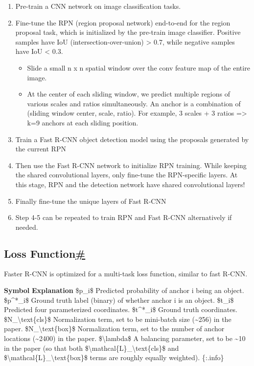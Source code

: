 \begin{enumerate}
\tightlist
\item
  Pre-train a CNN network on image classification tasks.
\item
  Fine-tune the RPN (region proposal network) end-to-end for the region proposal task, which is initialized by the pre-train image classifier. Positive samples have IoU (intersection-over-union) \textgreater{} 0.7, while negative samples have IoU \textless{} 0.3.

  \begin{itemize}
  \tightlist
  \item
    Slide a small n x n spatial window over the conv feature map of the entire image.
  \item
    At the center of each sliding window, we predict multiple regions of various scales and ratios simultaneously. An anchor is a combination of (sliding window center, scale, ratio). For example, 3 scales + 3 ratios =\textgreater{} k=9 anchors at each sliding position.
  \end{itemize}
\item
  Train a Fast R-CNN object detection model using the proposals generated by the current RPN
\item
  Then use the Fast R-CNN network to initialize RPN training. While keeping the shared convolutional layers, only fine-tune the RPN-specific layers. At this stage, RPN and the detection network have shared convolutional layers!
\item
  Finally fine-tune the unique layers of Fast R-CNN
\item
  Step 4-5 can be repeated to train RPN and Fast R-CNN alternatively if needed.
\end{enumerate}

\subsection{\texorpdfstring{Loss Function\hyperref[loss-function-1]{\#}}{Loss Function\#}}\label{loss-function-1}

Faster R-CNN is optimized for a multi-task loss function, similar to fast R-CNN.

\textbar{} \textbf{Symbol} \textbar{} \textbf{Explanation} \textbar{} \textbar{} \$p\_i\$ \textbar{} Predicted probability of anchor i being an object. \textbar{} \textbar{} \$p\^{}*\_i\$ \textbar{} Ground truth label (binary) of whether anchor i is an object. \textbar{} \textbar{} \$t\_i\$ \textbar{} Predicted four parameterized coordinates. \textbar{} \textbar{} \$t\^{}*\_i\$ \textbar{} Ground truth coordinates. \textbar{} \textbar{} \$N\_\textbackslash text\{cls\}\$ \textbar{} Normalization term, set to be mini-batch size (\textasciitilde256) in the paper. \textbar{} \textbar{} \$N\_\textbackslash text\{box\}\$ \textbar{} Normalization term, set to the number of anchor locations (\textasciitilde2400) in the paper. \textbar{} \textbar{} \$\textbackslash lambda\$ \textbar{} A balancing parameter, set to be \textasciitilde10 in the paper (so that both \$\textbackslash mathcal\{L\}\_\textbackslash text\{cls\}\$ and \$\textbackslash mathcal\{L\}\_\textbackslash text\{box\}\$ terms are roughly equally weighted). \textbar{} \{:.info\}

